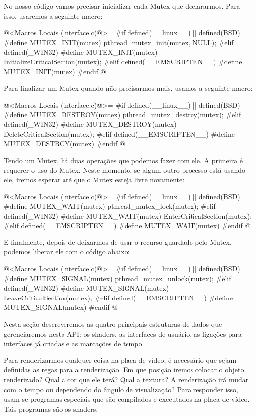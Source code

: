 No nosso código vamos precisar inicializar cada Mutex que
declararmos. Para isso, usaremos a seguinte macro:

\iniciocodigo
@<Macros Locais (interface.c)@>=
#if defined(__linux__) || defined(BSD)
#define MUTEX_INIT(mutex) pthread_mutex_init(mutex, NULL);
#elif defined(_WIN32)
#define MUTEX_INIT(mutex) InitializeCriticalSection(mutex);
#elif defined(__EMSCRIPTEN__)
#define MUTEX_INIT(mutex)
#endif
@
\fimcodigo

Para finalizar um Mutex quando não precisarmos mais, usamos a seguinte
macro:

\iniciocodigo
@<Macros Locais (interface.c)@>=
#if defined(__linux__) || defined(BSD)
#define MUTEX_DESTROY(mutex) pthread_mutex_destroy(mutex);
#elif defined(_WIN32)
#define MUTEX_DESTROY(mutex) DeleteCriticalSection(mutex);
#elif defined(__EMSCRIPTEN__)
#define MUTEX_DESTROY(mutex)
#endif
@
\fimcodigo

Tendo um Mutex, há duas operações que podemos fazer com ele. A
primeira é requerer o uso do Mutex. Neste momento, se algum outro
processo está usando ele, iremos esperar até que o Mutex esteja livre
novamente:

\iniciocodigo
@<Macros Locais (interface.c)@>=
#if defined(__linux__) || defined(BSD)
#define MUTEX_WAIT(mutex) pthread_mutex_lock(mutex);
#elif defined(_WIN32)
#define MUTEX_WAIT(mutex) EnterCriticalSection(mutex);
#elif defined(__EMSCRIPTEN__)
#define MUTEX_WAIT(mutex)
#endif
@
\fimcodigo

E finalmente, depois de deixarmos de usar o recurso guardado pelo
Mutex, podemos liberar ele com o código abaixo:

\iniciocodigo
@<Macros Locais (interface.c)@>=
#if defined(__linux__) || defined(BSD)
#define MUTEX_SIGNAL(mutex) pthread_mutex_unlock(mutex);
#elif defined(_WIN32)
#define MUTEX_SIGNAL(mutex) LeaveCriticalSection(mutex);
#elif defined(__EMSCRIPTEN__)
#define MUTEX_SIGNAL(mutex)
#endif
@
\fimcodigo


Nesta seção descreveremos as quatro principais estruturas de dados que
gerenciaremos nesta API: os shaders, as interfaces de usuário, as
ligações para interfaces já criadas e as marcações de tempo.


Para renderizarmos qualquer coisa na placa de vídeo, é necessário que
sejam definidas as regas para a renderização. Em que posição iremos
colocar o objeto renderizado? Qual a cor que ele terá? Qual a textura?
A renderização irá mudar com o tempo ou dependendo do ângulo de
visualização? Para responder isso, usam-se programas especiais que são
compilados e executados na placa de vídeo. Tais programas são os
shaders.

